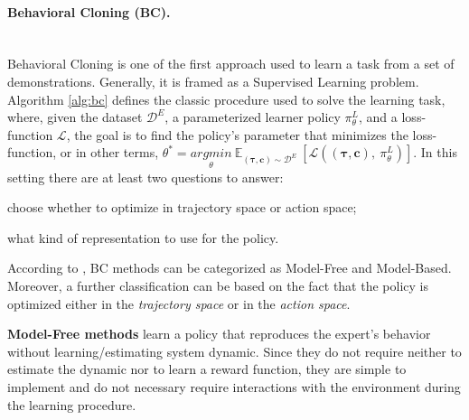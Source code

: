 \paragraph{Behavioral Cloning (BC).} \mbox{} \\
Behavioral Cloning is one of the first approach used to learn a task from a set of demonstrations. Generally, it is framed as a Supervised Learning problem. Algorithm \ref{alg:bc} defines the classic procedure used to solve the learning task, where, given the dataset $\mathcal{D}^{E}$, a parameterized learner policy $\pi^{L}_{\theta}$, and a loss-function $\mathcal{L}$, the goal is to find the policy's parameter that minimizes the loss-function, or in other terms, $\theta^{*} = \underset{\theta}{argmin} \ \mathbb{E}_{(\boldsymbol{\tau}, \mathbf{c}) \sim \mathcal{D}^{E}} \ [\mathcal{L}((\boldsymbol{\tau}, \mathbf{c}), \ \pi^{L}_{\theta})]$.
In this setting there are at least two questions to answer:
\begin{enumerate*}[label=\textbf{(\arabic*)}]
    \item choose whether to optimize in trajectory space or action space;
    \item what kind of representation to use for the policy.
\end{enumerate*}
\newline According to \cite{osa2018algorithmic}, BC methods can be categorized as Model-Free and Model-Based. Moreover, a further classification can be based on the fact that the policy is optimized either in the \textit{trajectory space} or in the \textit{action space}.


\textbf{Model-Free methods} learn a policy that reproduces the expert's behavior without learning/estimating system dynamic. Since they do not require neither to estimate the dynamic nor to learn a reward function, they are simple to implement and do not necessary require interactions with the environment during the learning procedure.

